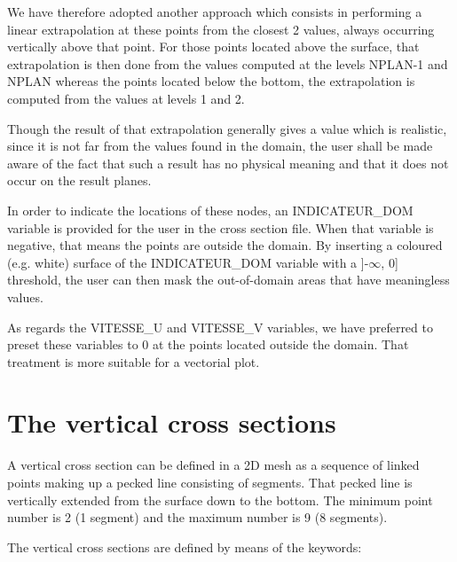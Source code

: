 We have therefore adopted another approach which consists in performing a
linear extrapolation at these points from the closest 2 values, always
occurring vertically above that point. For those points located above the
surface, that extrapolation is then done from the values computed at the levels
NPLAN-1 and NPLAN whereas the points located below the bottom, the
extrapolation is computed from the values at levels 1 and 2.

Though the result of that extrapolation generally gives a value which is
realistic, since it is not far from the values found in the domain, the user
shall be made aware of the fact that such a result has no physical meaning and
that it does not occur on the result planes.

In order to indicate the locations of these nodes, an INDICATEUR\_DOM variable
is provided for the user in the cross section file. When that variable is
negative, that means the points are outside the domain. By inserting a coloured
(e.g. white) surface of the INDICATEUR\_DOM variable with a ]-$\infty$, 0]
threshold, the user can then mask the out-of-domain areas that have meaningless
values.

As regards the VITESSE\_U and VITESSE\_V variables, we have preferred to preset
these variables to 0 at the points located outside the domain. That treatment
is more suitable for a vectorial plot.

\section{The vertical cross sections}

A vertical cross section can be defined in a 2D mesh as a sequence of linked
points making up a pecked line consisting of segments. That pecked line is
vertically extended from the surface down to the bottom. The minimum point
number is 2 (1 segment) and the maximum number is 9 (8 segments).

The vertical cross sections are defined by means of the keywords:

